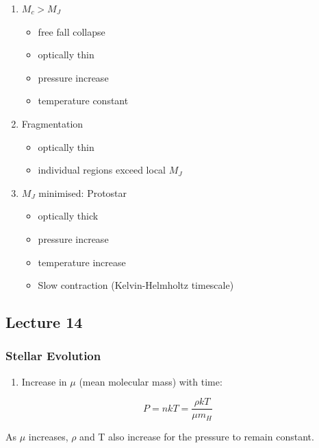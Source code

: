 \documentclass[a4paper,11pt,normalem]{article}
\begin{document}
\begin{enumerate}
\def\labelenumi{\arabic{enumi}.}
\item
  \(M_c > M_J\)

  \begin{itemize}
  \item
    free fall collapse
  \item
    optically thin
  \item
    pressure increase
  \item
    temperature constant
  \end{itemize}
\item
  Fragmentation

  \begin{itemize}
  \item
    optically thin
  \item
    individual regions exceed local \(M_J\)
  \end{itemize}
\item
  \(M_J\) minimised: Protostar

  \begin{itemize}
  \item
    optically thick
  \item
    pressure increase
  \item
    temperature increase
  \item
    Slow contraction (Kelvin-Helmholtz timescale)
  \end{itemize}
\end{enumerate}

\subsection{Lecture 14}\label{lecture-14}

\subsubsection{Stellar Evolution}\label{stellar-evolution}

\begin{enumerate}
\def\labelenumi{\arabic{enumi}.}
\item
  Increase in \(\mu\) (mean molecular mass) with time:
\end{enumerate}

\[
    P = nkT = \frac{\rho kT}{\mu m_H}
\]

As \(\mu\) increases, \(\rho\) and T also increase for the pressure to
remain constant.
\end{document}
